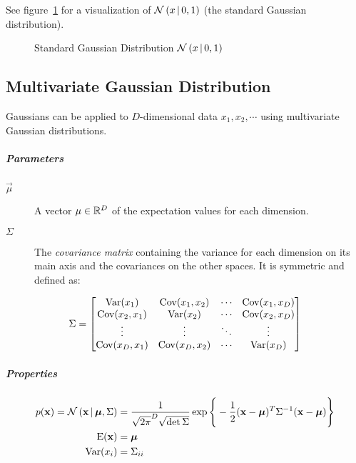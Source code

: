 				See figure~\ref{fig:gaussianDistribution} for a visualization of \( \mathcal{N}\,(x \,\vert\, 0, 1) \) (the standard Gaussian distribution).

				\begin{figure}
					\centering
					\caption{Standard Gaussian Distribution \( \mathcal{N}\,(x \,\vert\, 0, 1) \)}
					\label{fig:gaussianDistribution}
				\end{figure}

		\subsection{Multivariate Gaussian Distribution}
			Gaussians can be applied to \(D\)-dimensional data \(x_1, x_2, \cdots\) using multivariate Gaussian distributions.

			\subparagraph{Parameters}
			\begin{description}
				\item[\(\vec{\mu}\)] A vector \( \mu \in \mathbb{R}^D \) of the expectation values for each dimension.
				\item[\(\Sigma\)] The \emph{covariance matrix} containing the variance for each dimension on its main axis and the covariances on the other spaces. It is symmetric and defined as:
			\end{description}
			\begin{equation}
				\Sigma =
					\begin{bmatrix}
						\operatorname{Var}(x_1)      & \operatorname{Cov}(x_1, x_2) & \cdots & \operatorname{Cov}(x_1, x_D) \\
						\operatorname{Cov}(x_2, x_1) & \operatorname{Var}(x_2)      & \cdots & \operatorname{Cov}(x_2, x_D) \\
						\vdots         & \vdots         & \ddots & \vdots         \\
						\operatorname{Cov}(x_D, x_1) & \operatorname{Cov}(x_D, x_2) & \cdots & \operatorname{Var}(x_D)
					\end{bmatrix}
			\end{equation}

			\subparagraph{Properties}
			\begin{align}
				p(\boldsymbol{\mathrm{x}}) = \mathcal{N}\,(\boldsymbol{\mathrm{x}} \,\vert\, \boldsymbol{\mathrm{\mu}}, \Sigma) & = \frac{1}{\sqrt{2\pi}^D \sqrt{\det \Sigma}} \exp\Bigg\{ -\frac{1}{2} (\boldsymbol{\mathrm{x}} - \boldsymbol{\mathrm{\mu}})^T \Sigma^{-1} (\boldsymbol{\mathrm{x}} - \boldsymbol{\mathrm{\mu}}) \Bigg\} \\
				\operatorname{E}(\boldsymbol{\mathrm{x}})                                                & = \boldsymbol{\mathrm{\mu}}                                                                                                                             \\
				\operatorname{Var}(x_i)                                                  & = \Sigma_{ii}
			\end{align}

